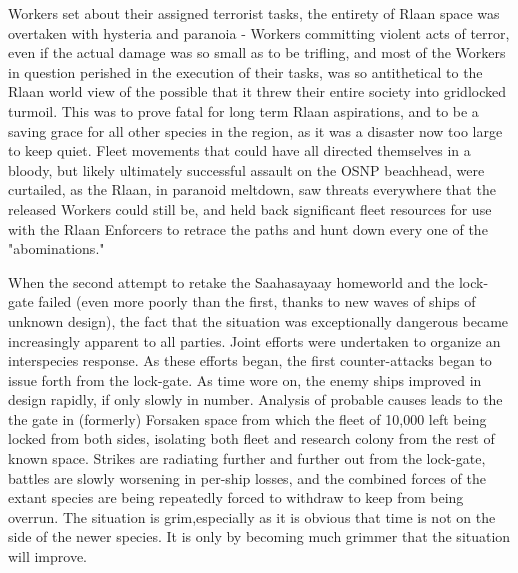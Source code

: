 Workers set about their assigned terrorist tasks, the entirety of
Rlaan space was overtaken with hysteria and paranoia - Workers
committing violent acts of terror, even if the actual damage was so
small as to be trifling, and most of the Workers in question perished
in the execution of their tasks, was so antithetical to the Rlaan
world view of the possible that it threw their entire society into
gridlocked turmoil. This was to prove fatal for long term Rlaan
aspirations, and to be a saving grace for all other species in the
region, as it was a disaster now too large to keep quiet. Fleet
movements that could have all directed themselves in a bloody, but
likely ultimately successful assault on the OSNP beachhead, were
curtailed, as the Rlaan, in paranoid meltdown, saw threats everywhere
that the released Workers could still be, and held back significant
fleet resources for use with the Rlaan Enforcers to retrace the paths
and hunt down every one of the "abominations."

When the second attempt to retake the Saahasayaay homeworld and the
lock-gate failed (even more poorly than the first, thanks to new waves
of ships of unknown design), the fact that the situation was
exceptionally dangerous became increasingly apparent to all
parties. Joint efforts were undertaken to organize an interspecies
response. As these efforts began, the first counter-attacks began to
issue forth from the lock-gate. As time wore on, the enemy ships
improved in design rapidly, if only slowly in number. Analysis of
probable causes leads to the the gate in (formerly) Forsaken space
from which the fleet of 10,000 left being locked from both sides,
isolating both fleet and research colony from the rest of known
space. Strikes are radiating further and further out from the
lock-gate, battles are slowly worsening in per-ship losses, and the
combined forces of the extant species are being repeatedly forced to
withdraw to keep from being overrun. The situation is grim,especially
as it is obvious that time is not on the side of the newer species. It
is only by becoming much grimmer that the situation will improve.

